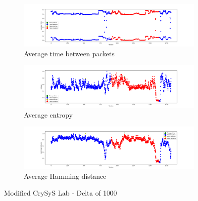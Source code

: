 \begin{figure}
    \centering
    \begin{subfigure}[b]{\linewidth}
        \includegraphics[width = \linewidth]{img/parts/app/tests/crysys/delta/AvgTime.png}
        \caption{Average time between packets}
        \label{subfig:extract_crysys_delta_avgtime}
    \end{subfigure}
    \begin{subfigure}[b]{\linewidth}
        \includegraphics[width = \linewidth]{img/parts/app/tests/crysys/delta/Entropy.png}
        \caption{Average entropy}
        \label{subfig:extract_crysys_delta_entropy}
    \end{subfigure}
    \begin{subfigure}[b]{\linewidth}
        \includegraphics[width = \linewidth]{img/parts/app/tests/crysys/delta/HammingDist.png}
        \caption{Average Hamming distance}
        \label{subfig:extract_crysys_delta_hammingdist}
    \end{subfigure}
    \caption{Modified CrySyS Lab - Delta of 1000}
    \label{fig:extract_crysys_delta}
\end{figure}

